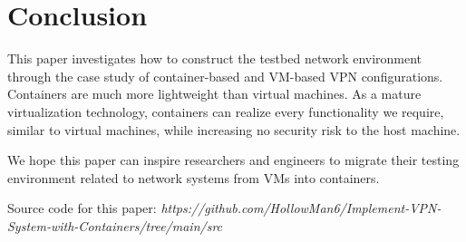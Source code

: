 \documentclass[article]{aaltoseries}
\begin{document}


\section{Conclusion}

This paper investigates how to construct the testbed network environment through the case study of container-based and VM-based VPN configurations. Containers are much more lightweight than virtual machines. As a mature virtualization technology, containers can realize every functionality we require, similar to virtual machines, while increasing no security risk to the host machine.

We hope this paper can inspire researchers and engineers to migrate their testing environment related to network systems from VMs into containers.

Source code for this paper: \textit{https://github.com/HollowMan6/Implement-VPN-System-with-Containers/tree/main/src}











\end{document}
